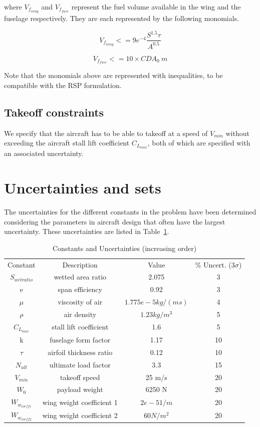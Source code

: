 \documentclass{article}
\begin{document}
where $V_{f_{wing}}$ and $V_{f_{fuse}}$ represent the fuel volume available in the wing and the fuselage respectively. They are each represented by the following monomials. 

\begin{equation}
\label{eq:fuelwing}
V_{f_{wing}} <= 9e^{-4}\frac{S^{1.5}\tau}{A^{0.5}}
\end{equation}

\begin{equation}
\label{eq:fuelfuse}
V_{f_{fuse}} <= 10 \times CDA_0~m
\end{equation}

Note that the monomials above are represented with inequalities, to be compatible with the RSP formulation. 

\subsection{Takeoff constraints}
We specify that the aircraft has to be able to takeoff at a speed of $V_{min}$ without exceeding the aircraft stall lift coefficient $C_{L_{max}}$, both of which are specified with an associated uncertainty. 

\section{Uncertainties and sets}

The uncertainties for the different constants in the problem have been determined considering the parameters in aircraft design that often have the largest uncertainty. These uncertainties are listed in Table~\ref{tab:uncertainties}.

\begin{table}
\begin{center}
\caption{\label{tab:uncertainties} Constants and Uncertainties (increasing order)}
\begin{tabular}{c c c c}
\hline
Constant & Description & Value & \% Uncert. ($3\sigma$) \\
$S_{wetratio}$ & wetted area ratio & 2.075 & 3 \\
e & span efficiency & 0.92 & 3 \\
$\mu$ & viscosity of air & $1.775e-5 kg/(ms)$ & 4 \\
$\rho$ & air density & $1.23 kg/m^3$ & 5 \\
$C_{L_{max}}$ & stall lift coefficient & 1.6 & 5\\
k & fuselage form factor & 1.17 & 10\\
$\tau$ & airfoil thickness ratio & 0.12 & 10\\
$N_{ult}$ & ultimate load factor & 3.3 & 15\\
$V_{min}$ & takeoff speed & 25 m/s & 20\\
$W_0$ & payload weight & 6250 N & 20\\
$W_{w_{coeff1}}$ & wing weight coefficient 1 & $2e-5 1/m$ & 20\\
$W_{w_{coeff2}}$ & wing weight coefficient 2 & $60 N/m^2$ & 20\\
\hline
\end{tabular}
\end{center}
\end{table}
\end{document}
